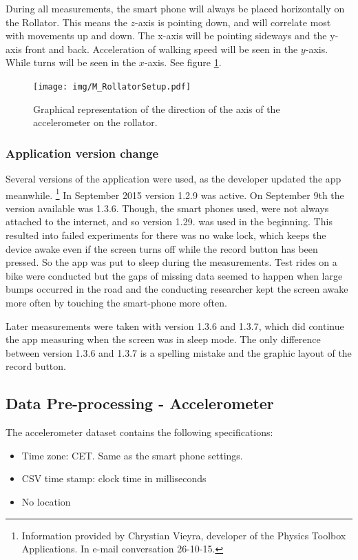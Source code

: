 During all measurements, the smart phone will always be placed horizontally on the Rollator. This means the $z$-axis is pointing down, and will correlate most with movements up and down. The x-axis will be pointing sideways and the y-axis front and back. Acceleration of walking speed will be seen in the $y$-axis. While turns will be seen in the $x$-axis. See figure \ref{setup}.
\begin{figure}[t]
\texttt{[image: img/M\_RollatorSetup.pdf]}
\centering
\caption{ Graphical representation of the direction of the axis of the accelerometer on the rollator. \label{setup}}
\end{figure}


\subsubsection{Application version change}
Several versions of the application were used, as the developer updated the app meanwhile. \footnote{Information provided by Chrystian Vieyra, developer of the Physics Toolbox Applications. In e-mail conversation 26-10-15. }
In September 2015 version 1.2.9 was active. On September 9th the version available was 1.3.6. Though, the smart phones used, were not always attached to the internet, and so version 1.29. was used in the beginning. This resulted into failed experiments for there was no wake lock, which keeps the device awake even if the screen turns off while the record button has been pressed. So the app was put to sleep during the measurements. Test rides on a bike were conducted but the gaps of missing data seemed to happen when large bumps occurred in the road and the conducting researcher kept the screen awake more often by touching the smart-phone more often. 

Later measurements were taken with version 1.3.6 and 1.3.7, which did continue the app measuring when the screen was in sleep mode. The only difference between version 1.3.6 and 1.3.7 is a spelling mistake and the graphic layout of the record button.


\subsection{Data Pre-processing - Accelerometer}
The accelerometer dataset contains the following specifications:
\begin{itemize}
\item Time zone: CET. Same as the smart phone settings. 
\item CSV time stamp: clock time in milliseconds
\item No location
\end{itemize}

